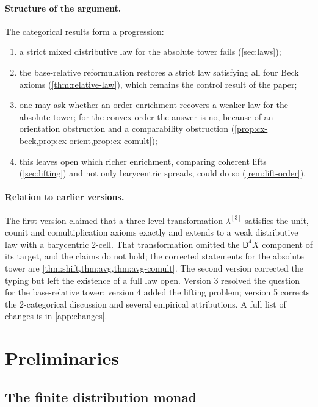 \documentclass[11pt]{article}
\theoremstyle{definition}
\theoremstyle{remark}
\newcommand{\D}{\mathsf{D}}
\begin{document}
\paragraph{Structure of the argument.} The categorical results form a progression:
\begin{enumerate}[label=(\arabic*),leftmargin=*]
\item a strict mixed distributive law for the absolute tower fails (\cref{sec:laws});
\item the base-relative reformulation restores a strict law satisfying all four Beck axioms
  (\cref{thm:relative-law}), which remains the control result of the paper;
\item one may ask whether an order enrichment recovers a weaker law for the absolute tower; for the
  convex order the answer is no, because of an orientation obstruction and a comparability
  obstruction (\cref{prop:cx-beck,prop:cx-orient,prop:cx-comult});
\item this leaves open which richer enrichment, comparing coherent lifts (\cref{sec:lifting}) and not
  only barycentric spreads, could do so (\cref{rem:lift-order}).
\end{enumerate}

\paragraph{Relation to earlier versions.} The first version claimed that a three-level
transformation $\lambda^{[3]}$ satisfies the unit, counit and comultiplication axioms exactly and
extends to a weak distributive law with a barycentric 2-cell. That transformation omitted the
$\D^4X$ component of its target, and the claims do not hold; the corrected statements for the
absolute tower are \cref{thm:shift,thm:avg,thm:avg-comult}. The second version corrected the typing
but left the existence of a full law open. Version 3 resolved the question for the base-relative
tower; version 4 added the lifting problem; version 5 corrects the 2-categorical discussion and
several empirical attributions. A full list of changes is in \cref{app:changes}.

\section{Preliminaries}

\subsection{The finite distribution monad}
\end{document}
